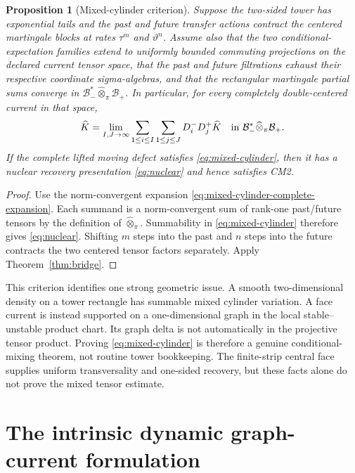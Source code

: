 \documentclass[11pt]{article}
\newtheorem{proposition}[theorem]{Proposition}
\begin{document}
\begin{proposition}[Mixed-cylinder criterion]
\label{prop:mixed-cylinder}
Suppose the two-sided tower has exponential tails and the past and future
transfer actions contract the centered martingale blocks at rates
$\tau^m$ and $\vartheta^n$.  Assume also that the two conditional-expectation
families extend to uniformly bounded commuting projections on the declared
current tensor space, that the past and future filtrations exhaust their
respective coordinate sigma-algebras, and that the rectangular martingale
partial sums converge in
$\mathcal B_-^*\widehat\otimes_\pi\mathcal B_+$.  In particular, for every
completely double-centered current in that space,
\begin{equation}
\label{eq:mixed-cylinder-complete-expansion}
 \widehat K
 =\lim_{I,J\to\infty}
   \sum_{1\le i\le I}\sum_{1\le j\le J}
       D_i^-D_j^+\widehat K
 \quad\hbox{in }\mathcal B_-^*\widehat\otimes_\pi\mathcal B_+.
\end{equation}
If the complete lifted moving defect satisfies
\eqref{eq:mixed-cylinder}, then it has a nuclear recovery presentation
\eqref{eq:nuclear} and hence satisfies CM2.
\end{proposition}

\begin{proof}
Use the norm-convergent expansion
\eqref{eq:mixed-cylinder-complete-expansion}.  Each summand is a
norm-convergent sum of
rank-one past/future tensors by the definition of
$\widehat\otimes_\pi$.  Summability in \eqref{eq:mixed-cylinder} therefore
gives \eqref{eq:nuclear}.  Shifting $m$ steps into the past and $n$ steps into
the future contracts the two centered tensor factors separately.  Apply
Theorem~\ref{thm:bridge}.
\end{proof}

This criterion identifies one strong geometric issue.  A smooth two-dimensional
density on a tower rectangle has summable mixed cylinder variation.  A face
current is instead supported on a one-dimensional graph in the local
stable--unstable product chart.  Its graph delta is not automatically in the
projective tensor product.  Proving \eqref{eq:mixed-cylinder} is therefore a
genuine conditional-mixing theorem, not routine tower bookkeeping.  The
finite-strip central face supplies uniform transversality and one-sided
recovery, but these facts alone do not prove the mixed tensor estimate.

\section{The intrinsic dynamic graph-current formulation}
\end{document}
